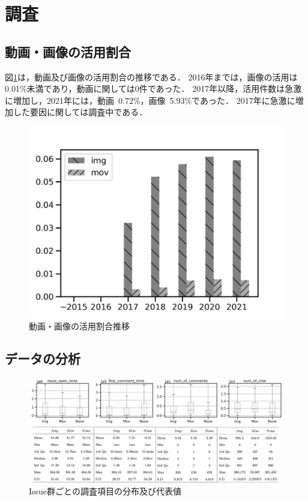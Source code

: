 \section{調査}
\subsection{動画・画像の活用割合}
図\ref{content_trend}は，動画及び画像の活用割合の推移である．
2016年までは，画像の活用は0.01\%未満であり，動画に関しては0件であった．
2017年以降，活用件数は急激に増加し，2021年には，動画~0.72\%，画像~5.93\%であった．
2017年に急激に増加した要因に関しては調査中である．

\begin{figure}[t]
  \begin{center}
      \includegraphics[scale=0.45]{./image/data_content_trends.pdf}
      \caption{動画・画像の活用割合推移 \label{content_trend}}
  \end{center}
\end{figure}

\subsection{データの分析}

\begin{figure}[t]
  \begin{center}
      \includegraphics[scale=1.1]{./image/dataset_plot.pdf}
      \caption{Issue群ごとの調査項目の分布及び代表値 \label{dataset_plot}}
  \end{center}
\end{figure}

